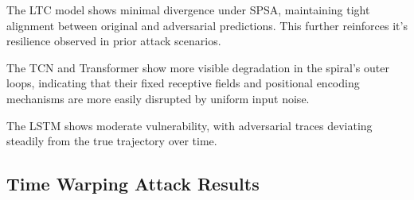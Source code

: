 The LTC model shows minimal divergence under SPSA, maintaining tight alignment between original and adversarial predictions. This further reinforces it's resilience observed in prior attack scenarios.

The TCN and Transformer show more visible degradation in the spiral's outer loops, indicating that their fixed receptive fields and positional encoding mechanisms are more easily disrupted by uniform input noise. 

The LSTM shows moderate vulnerability, with adversarial traces deviating steadily from the true trajectory over time.

\subsection*{Time Warping Attack Results}

